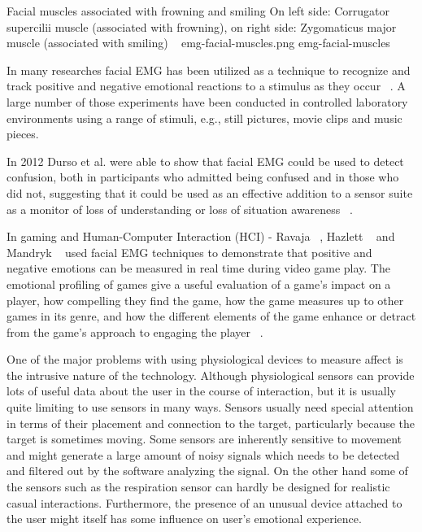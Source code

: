 \img
{Facial muscles associated with frowning and smiling}
{On left side: Corrugator supercilii muscle (associated with frowning), on right side: Zygomaticus major muscle (associated with smiling) ~\cite{wiki2014facial}}
{emg-facial-muscles.png}
{emg-facial-muscles}

In many researches facial EMG has been utilized as a technique to recognize and track positive and negative emotional reactions to a stimulus as they occur ~\cite{wolf2005facial}. A large number of those experiments have been conducted in controlled laboratory environments using a range of stimuli, e.g., still pictures, movie clips and music pieces.

In 2012 Durso et al. were able to show that facial EMG could be used to detect confusion, both in participants who admitted being confused and in those who did not, suggesting that it could be used as an effective addition to a sensor suite as a monitor of loss of understanding or loss of situation awareness ~\cite{durso2012detecting}.

In gaming and Human-Computer Interaction (HCI) - Ravaja ~\cite{ravaja2008psychophysiology}, Hazlett ~\cite{hazlett2006measuring} and Mandryk ~\cite{mandryk2007fuzzy} used facial EMG techniques to demonstrate that positive and negative emotions can be measured in real time during video game play. The emotional profiling of games give a useful evaluation of a game's impact on a player, how compelling they find the game, how the game measures up to other games in its genre, and how the different elements of the game enhance or detract from the game's approach to engaging the player ~\cite{nacke2010affective}.

One of the major problems with using physiological devices to measure affect is the intrusive nature of the technology. Although physiological sensors can provide lots of useful data about the user in the course of interaction, but  it is usually quite limiting to use sensors in many ways. Sensors usually need special attention in terms of their placement and connection to the target, particularly because the target is sometimes moving. Some sensors are inherently sensitive to movement and might generate a large amount of noisy signals which needs to be detected and filtered out by the software analyzing the signal. On the other hand some of the sensors such as the respiration sensor can hardly be designed for realistic casual interactions. Furthermore, the presence of an unusual device attached to the user might itself has some influence on user's emotional experience.

